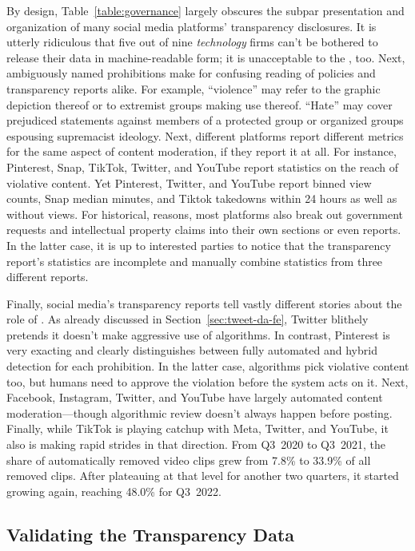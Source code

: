 By design, Table~\ref{table:governance} largely obscures the subpar presentation
and organization of many social media platforms' transparency disclosures. It is
utterly ridiculous that five out of nine \emph{technology} firms can't be
bothered to release their data in machine-readable form; it is unacceptable to
the , too. Next, ambiguously named prohibitions make for confusing reading of
policies and transparency reports alike. For example, ``violence'' may refer to
the graphic depiction thereof or to extremist groups making use thereof.
``Hate'' may cover prejudiced statements against members of a protected group or
organized groups espousing supremacist ideology. Next, different platforms
report different metrics for the same aspect of content moderation, if they
report it at all. For instance, Pinterest, Snap, TikTok, Twitter, and YouTube
report statistics on the reach of violative content. Yet Pinterest, Twitter, and
YouTube report binned view counts, Snap median minutes, and Tiktok takedowns
within 24 hours as well as without views. For historical, reasons, most
platforms also break out government requests and intellectual property claims
into their own sections or even reports. In the latter case, it is up to
interested parties to notice that the transparency report's statistics are
incomplete and manually combine statistics from three different reports.

Finally, social media's transparency reports tell vastly different stories about
the role of . As already discussed in Section~\ref{sec:tweet-da-fe}, Twitter
blithely pretends it doesn't make aggressive use of algorithms. In contrast,
Pinterest is very exacting and clearly distinguishes between fully automated and
hybrid detection for each prohibition. In the latter case, algorithms pick
violative content too, but humans need to approve the violation before the
system acts on it. Next, Facebook, Instagram, Twitter, and YouTube have largely
automated content moderation---though algorithmic review doesn't always happen
before posting. Finally, while TikTok is playing catchup with Meta, Twitter, and
YouTube, it also is making rapid strides in that direction. From Q3~2020 to
Q3~2021, the share of automatically removed video clips grew from 7.8\% to
33.9\% of all removed clips. After plateauing at that level for another two
quarters, it started growing again, reaching 48.0\% for Q3~2022.


\subsection{Validating the Transparency Data}
\label{sec:census-validation}

